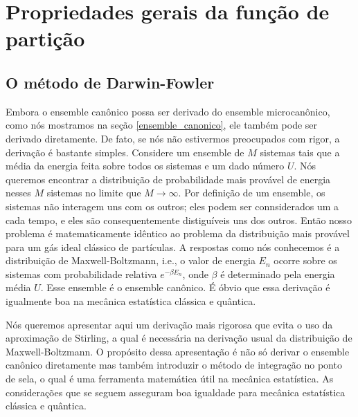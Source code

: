 \chapter{Propriedades gerais da função de partição}
\noindent

\section{O método de Darwin-Fowler}
\noindent

Embora o ensemble canônico possa ser derivado do ensemble microcanônico, como nós mostramos na seção \ref{ensemble_canonico}, ele também pode ser derivado diretamente. De fato, se nós não estivermos preocupados com rigor, a derivação é bastante simples. Considere um ensemble de $M$ sistemas tais que a média da energia feita sobre todos os sistemas e um dado número $U$. Nós queremos encontrar a distribuição de probabilidade mais provável de energia nesses $M$ sistemas no limite que $M \rightarrow \infty$. Por definição de um ensemble, os sistemas não interagem uns com os outros; eles podem ser connsiderados um a cada tempo, e eles são consequentemente distiguíveis uns dos outros. Então nosso problema é matematicamente idêntico ao problema da distribuição mais provável para um gás ideal clássico de partículas. A respostas como nós conhecemos é a distribuição de Maxwell-Boltzmann, i.e., o valor de energia $E_{n}$ ocorre sobre os sistemas com probabilidade relativa $e^{-\beta E_{n}}$, onde $\beta$ é determinado pela energia média $U$. Esse ensemble é o ensemble canônico. É óbvio que essa derivação é igualmente boa na mecânica estatística clássica e quântica.

Nós queremos apresentar aqui um derivação mais rigorosa que evita o uso da aproximação de Stirling, a qual é necessária na derivação usual da distribuição de Maxwell-Boltzmann. O propósito dessa apresentação é não só derivar o ensemble canônico diretamente mas também introduzir o método de integração no ponto de sela, o qual é uma ferramenta matemática útil na mecânica estatística. As considerações que se seguem asseguram boa igualdade para mecânica estatística clássica e quântica.

